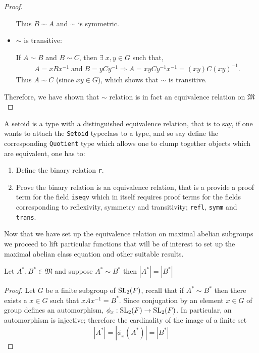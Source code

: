 \begin{footnotesize}
\begin{proof}
\begin{itemize}
Thus $B \sim A$ and $\sim$ is symmetric.\\

\item $\sim$ is transitive:

If $A \sim B$ and $B \sim C$, then $\exists \; x, y \in G$  such that,
\begin{align*} A = xBx^{-1} \; \text{and} \; B = yCy^{-1} \Rightarrow A = xyCy^{-1}x^{-1} = (xy)C(xy)^{-1}.
\end{align*}
Thus $A \sim C$ (since $xy \in G$), which shows that $\sim$ is transitive. \\
\end{itemize}
Therefore, we have shown that $\sim$ relation is in fact an equivalence relation on $\mathfrak{M}$
\end{proof}



\begin{remark}
  A setoid is a type with a distinguished equivalence relation, that is to say, if one wants to attach the \texttt{Setoid} 
  typeclass to a type, and so say define the corresponding \texttt{Quotient} type which allows one to clump together objects which are equivalent, one has to:
  \begin{enumerate}
    \item Define the binary relation \texttt{r}.
    \item Prove the binary relation is an equivalence relation, that is a provide a proof term
     for the field \texttt{iseqv} which in itself requires proof terms for the fields corresponding to 
     reflexivity, symmetry and transitivity; \texttt{refl}, \texttt{symm} and \texttt{trans}.
  \end{enumerate} 
\end{remark}


Now that we have set up the equivalence relation on maximal abelian subgroups we proceed to lift particular functions that will be of interest to set up the maximal abelian class equation and 
other suitable results.

\begin{lemma}
  \label{card_noncenter_eq_of_related}
  \leanok
  Let $A^*, B^* \in \mathfrak{M}$ and suppose $A^* \sim B^*$ then $|A^*| = |B^*|$
\end{lemma}
\begin{proof}
  \leanok
  Let $G$ be a finite subgroup of $\operatorname{SL}_2(F)$, recall that if $A^* \sim B^*$ then there exists a $x \in G$ such that $x A x^{-1} = B^*$.
  Since conjugation by an element $x \in G$ of group defines an automorphism, $\phi_x : \operatorname{SL}_2(F) \rightarrow \operatorname{SL}_2(F)$. In particular, an automorphism is injective; 
  therefore the cardinality of the image of a finite set
  \[
  |A^*| = |\phi_x(A^*)| = |B^*|
  \]
\end{proof}



\end{footnotesize}
